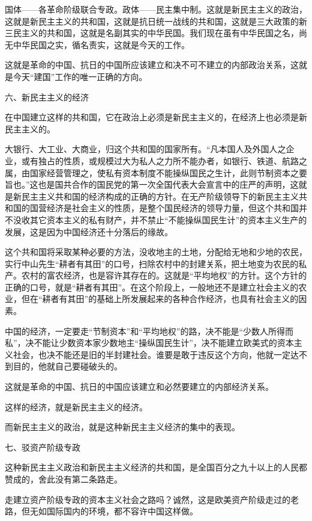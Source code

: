 \documentclass[UTF8, 12pt, a4paper]{ctexrep}
\begin{document}
国体——各革命阶级联合专政。政体——民主集中制。这就是新民主主义的政治，这就是新民主主义的共和国，这就是抗日统一战线的共和国，这就是三大政策的新三民主义的共和国，这就是名副其实的中华民国。我们现在虽有中华民国之名，尚无中华民国之实，循名责实，这就是今天的工作。

这就是革命的中国、抗日的中国所应该建立和决不可不建立的内部政治关系，这就是今天“建国”工作的唯一正确的方向。

六、新民主主义的经济

在中国建立这样的共和国，它在政治上必须是新民主主义的，在经济上也必须是新民主主义的。

大银行、大工业、大商业，归这个共和国的国家所有。“凡本国人及外国人之企业，或有独占的性质，或规模过大为私人之力所不能办者，如银行、铁道、航路之属，由国家经营管理之，使私有资本制度不能操纵国民之生计，此则节制资本之要旨也。”这也是国共合作的国民党的第一次全国代表大会宣言中的庄严的声明，这就是新民主主义共和国的经济构成的正确的方针。在无产阶级领导下的新民主主义共和国的国营经济是社会主义的性质，是整个国民经济的领导力量，但这个共和国并不没收其它资本主义的私有财产，并不禁止“不能操纵国民生计”的资本主义生产的发展，这是因为中国经济还十分落后的缘故。

这个共和国将采取某种必要的方法，没收地主的土地，分配给无地和少地的农民，实行中山先生“耕者有其田”的口号，扫除农村中的封建关系，把土地变为农民的私产。农村的富农经济，也是容许其存在的。这就是“平均地权”的方针。这个方针的正确的口号，就是“耕者有其田”。在这个阶段上，一般地还不是建立社会主义的农业，但在“耕者有其田”的基础上所发展起来的各种合作经济，也具有社会主义的因素。

中国的经济，一定要走“节制资本”和“平均地权”的路，决不能是“少数人所得而私”，决不能让少数资本家少数地主“操纵国民生计”，决不能建立欧美式的资本主义社会，也决不能还是旧的半封建社会。谁要是敢于违反这个方向，他就一定达不到目的，他就自己要碰破头的。

这就是革命的中国、抗日的中国应该建立和必然要建立的内部经济关系。

这样的经济，就是新民主主义的经济。

而新民主主义的政治，就是这种新民主主义经济的集中的表现。

七、驳资产阶级专政

这种新民主主义政治和新民主主义经济的共和国，是全国百分之九十以上的人民都赞成的，舍此没有第二条路走。

走建立资产阶级专政的资本主义社会之路吗？诚然，这是欧美资产阶级走过的老路，但无如国际国内的环境，都不容许中国这样做。
\end{document}
